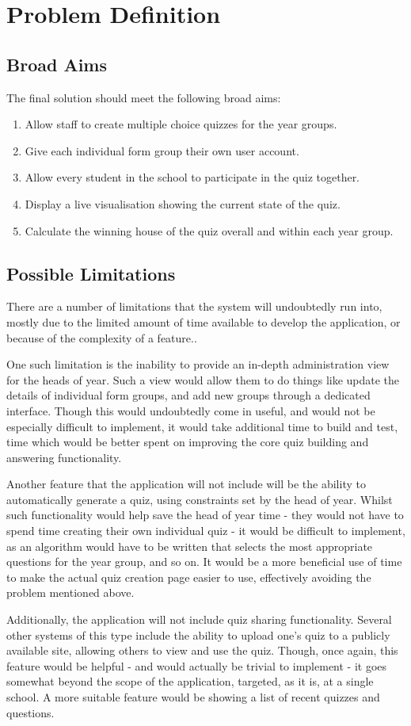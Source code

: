 \section{Problem Definition}

\subsection{Broad Aims}
The final solution should meet the following broad aims:

\begin{enumerate}
	\item Allow staff to create multiple choice quizzes for the year groups.
	\item Give each individual form group their own user account.
	\item Allow every student in the school to participate in the quiz together.
	\item Display a live visualisation showing the current state of the quiz.
	\item Calculate the winning house of the quiz overall and within each year group.
\end{enumerate}

\subsection{Possible Limitations}
There are a number of limitations that the system will undoubtedly run into, mostly due to the limited amount of time available to develop the application, or because of the complexity of a feature..

One such limitation is the inability to provide an in-depth administration view for the heads of year. Such a view would allow them to do things like update the details of individual form groups, and add new groups through a dedicated interface. Though this would undoubtedly come in useful, and would not be especially difficult to implement, it would take additional time to build and test, time which would be better spent on improving the core quiz building and answering functionality.

Another feature that the application will not include will be the ability to automatically generate a quiz, using constraints set by the head of year. Whilst such functionality would help save the head of year time - they would not have to spend time creating their own individual quiz - it would be difficult to implement, as an algorithm would have to be written that selects the most appropriate questions for the year group, and so on. It would be a more beneficial use of time to make the actual quiz creation page easier to use, effectively avoiding the problem mentioned above.

Additionally, the application will not include quiz sharing functionality. Several other systems of this type include the ability to upload one's quiz to a publicly available site, allowing others to view and use the quiz. Though, once again, this feature would be helpful - and would actually be trivial to implement - it goes somewhat beyond the scope of the application, targeted, as it is, at a single school. A more suitable feature would be showing a list of recent quizzes and questions.
